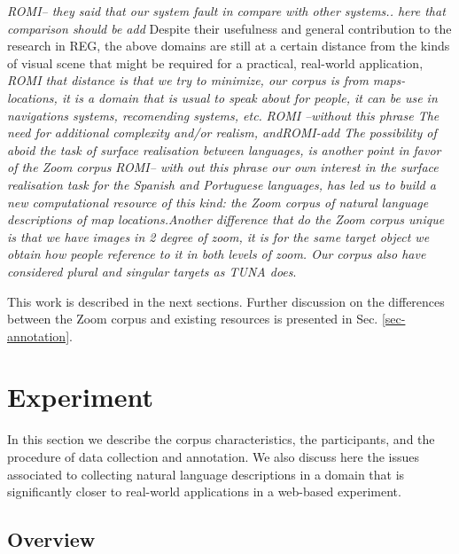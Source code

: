 \documentclass{article}
\begin{document}
{\it ROMI-- they said that our system fault in compare with other systems.. here that comparison should be add}
Despite their usefulness and general contribution to the research in REG, the above domains are still at a certain distance from the kinds of visual scene that might be required for a practical, real-world application, {\it ROMI that distance is that we try to minimize, our corpus is from maps-locations, it is a domain that is usual to speak about for people, it can be use in navigations systems, recomending systems, etc.} {\it ROMI --without this phrase The need for additional complexity and/or realism, and}{\it ROMI-add The possibility of aboid the task of surface realisation between languages, is another point in favor of the Zoom corpus} {\it ROMI-- with out this phrase our own interest in the surface realisation task for the Spanish and Portuguese languages, has led us to build a new computational resource of this kind: the Zoom corpus of natural language descriptions of map locations.}{\it Another difference that do the Zoom corpus unique is that we have images in 2 degree of zoom, it is for the same target object we obtain how people reference to it in both levels of zoom. Our corpus also have considered plural and singular targets as TUNA does}.

 This work is described in the next sections. Further discussion on the differences between the Zoom corpus and existing resources is presented in Sec. \ref{sec-annotation}. 


\section{Experiment}
\label{sec-experiment}

In this section we describe the corpus characteristics, the participants, and the procedure of data collection and annotation. We also discuss here the issues associated to collecting natural language descriptions in a domain that is significantly closer to real-world applications in a web-based experiment.   

\subsection{Overview}
\end{document}
